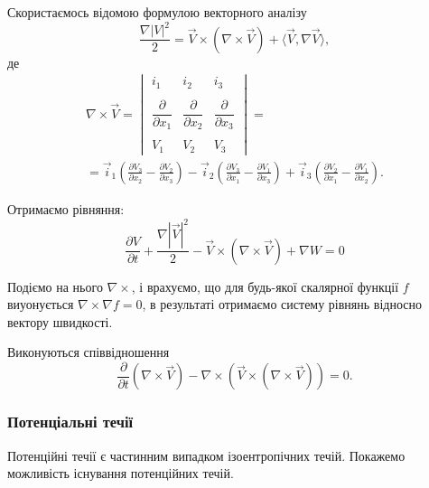 Скористаємось відомою формулою векторного аналізу
\begin{equation}
	\frac{\nabla |V|^2}{2} = \vec V \times (\nabla \times \vec V) + \langle \vec V, \nabla \vec V \rangle,
\end{equation}
де
\begin{multline}
	\nabla \times \vec V = 
	\begin{vmatrix} 
		i_1 & i_2 & i_3 \\ \\[-.25cm]
		\dfrac{\partial}{\partial x_1} & \dfrac{\partial}{\partial x_2} & \dfrac{\partial}{\partial x_3} \\ \\[-.25cm]
		V_1 & V_2 & V_3
	\end{vmatrix} = \\
	= \vec i_1 \left( \frac{\partial V_3}{\partial x_2} - \frac{\partial V_2}{\partial x_3} \right) - \vec i_2 \left( \frac{\partial V_3}{\partial x_1} - \frac{\partial V_1}{\partial x_3} \right) + \vec i_3 \left( \frac{\partial V_2}{\partial x_1} - \frac{\partial V_1}{\partial x_2} \right).
\end{multline}

Отримаємо рівняння:
\begin{equation}
	\label{eq:3.3.64}
	\frac{\partial V}{\partial t} + \frac{\nabla \left| \vec V\right|^2}{2} - \vec V \times( \nabla \times \vec V) + \nabla W = 0
\end{equation}

Подіємо на нього $\nabla \times$, і врахуємо, що для будь-якої скалярної функції $f$ виуонується $\nabla \times \nabla f = 0$, в результаті отримаємо систему рівнянь відносно вектору швидкості.

\begin{th_equation}
	Виконуються співвідношення
	\begin{equation}
		\frac{\partial}{\partial t} \left(\nabla \times \vec V\right) - \nabla \times (\vec V \times (\nabla \times \vec V)) = 0.
	\end{equation}
\end{th_equation}

\subsubsection{Потенціальні течії}

Потенційні течії є частинним випадком ізоентропічних течій. Покажемо можливість існування потенційних течій. \medskip

